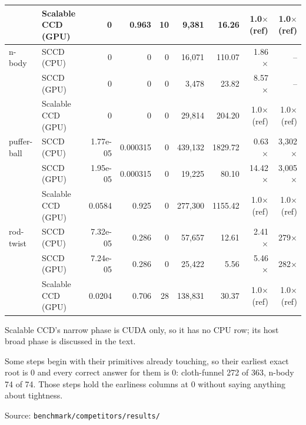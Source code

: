 \begin{table}[htbp]
{\begin{tabular}{llrrrrrrr}
     & Scalable CCD (GPU) & 0 & 0.963 & 10 & 9,381 & 16.26 & 1.0$\times$ (ref) & 1.0$\times$ (ref) \\
    \midrule
    n-body & SCCD (CPU) & 0 & 0 & 0 & 16,071 & 110.07 & 1.86$\times$ & -- \\
     & SCCD (GPU) & 0 & 0 & 0 & 3,478 & 23.82 & 8.57$\times$ & -- \\
     & Scalable CCD (GPU) & 0 & 0 & 0 & 29,814 & 204.20 & 1.0$\times$ (ref) & 1.0$\times$ (ref) \\
    \midrule
    puffer-ball & SCCD (CPU) & 1.77e-05 & 0.000315 & 0 & 439,132 & 1829.72 & 0.63$\times$ & 3,302$\times$ \\
     & SCCD (GPU) & 1.95e-05 & 0.000315 & 0 & 19,225 & 80.10 & 14.42$\times$ & 3,005$\times$ \\
     & Scalable CCD (GPU) & 0.0584 & 0.925 & 0 & 277,300 & 1155.42 & 1.0$\times$ (ref) & 1.0$\times$ (ref) \\
    \midrule
    rod-twist & SCCD (CPU) & 7.32e-05 & 0.286 & 0 & 57,657 & 12.61 & 2.41$\times$ & 279$\times$ \\
     & SCCD (GPU) & 7.24e-05 & 0.286 & 0 & 25,422 & 5.56 & 5.46$\times$ & 282$\times$ \\
     & Scalable CCD (GPU) & 0.0204 & 0.706 & 28 & 138,831 & 30.37 & 1.0$\times$ (ref) & 1.0$\times$ (ref) \\
    \bottomrule
  \end{tabular}}
  \par\smallskip\footnotesize Scalable CCD's narrow phase is CUDA only, so it has
  no CPU row; its host broad phase is discussed in the text.
  \par\smallskip\footnotesize Some steps begin with their primitives already
  touching, so their earliest exact root is $0$ and every correct answer for them
  is $0$: cloth-funnel 272 of 363, n-body 74 of 74. Those steps hold the earliness columns at $0$
  without saying anything about tightness.
  \par\smallskip\footnotesize Source: \texttt{benchmark/competitors/results/}
\end{table}
